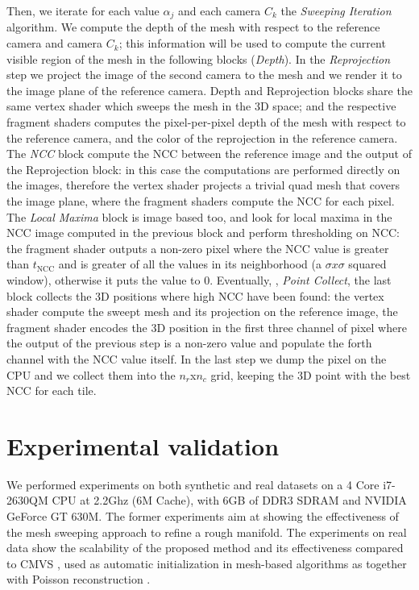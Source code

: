 Then, we iterate for each value $\alpha_j$ and each camera $C_k$ the \emph{Sweeping Iteration} algorithm. 
We compute the depth of the mesh with respect to the reference camera and camera $C_k$; this information will be used to compute the current visible region of the mesh in the following blocks (\emph{Depth}).
In the \emph{Reprojection} step we project the image of the second camera to the mesh and we render it to the image plane of the reference camera. 
Depth and  Reprojection blocks share the same vertex shader which sweeps the mesh in the 3D space; and the respective fragment shaders computes the pixel-per-pixel depth of the mesh with respect to the reference camera, and the color of the reprojection in the reference camera.
The \emph{NCC} block compute the NCC between the reference image and the output of the Reprojection block: in this case the computations are performed directly on the images, therefore the vertex shader projects a trivial quad mesh that covers the image plane, where the fragment shaders compute the NCC for each pixel.
The \emph{Local Maxima} block is image based too, and look for local maxima in the NCC image computed in the previous block and perform thresholding on NCC: the fragment shader outputs a non-zero pixel where the NCC value is greater than $t_{\text{NCC}}$ and is greater of all the values in its neighborhood (a $\sigma x \sigma$ squared window), otherwise it puts the value to $0$.
Eventually, \ie, \emph{Point Collect}, the last block collects the 3D positions where high NCC have been found: the vertex shader compute the sweept mesh and its projection on the reference image, the fragment shader encodes the 3D position in the first three channel of pixel where the output of the previous step is a non-zero value and populate the forth channel with the NCC value itself.
In the last step we dump the pixel on the CPU and we collect them into the $n_r$x$n_c$ grid, keeping the 3D point with the best NCC for each tile.



\section{Experimental validation}

We performed experiments on both synthetic and real datasets on a 4 Core i7-2630QM CPU at 2.2Ghz (6M Cache), with 6GB of DDR3 SDRAM and NVIDIA GeForce GT 630M. The former experiments aim at showing the effectiveness of the mesh sweeping approach to refine a rough manifold.
The experiments on real data show the scalability of the proposed method and its effectiveness compared to CMVS \cite{fu10}, used as automatic initialization in mesh-based algorithms as \cite{pan2015automatic,li2015detail} together with Poisson reconstruction \cite{kazhdan2006poisson}. 


